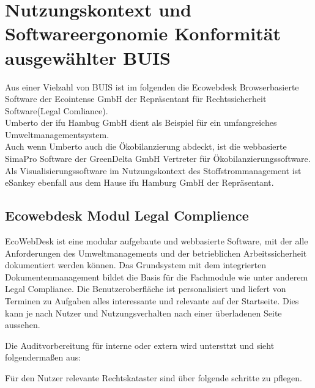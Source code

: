 \documentclass[a4paper, 12pt, twoside, BCOR=20mm, DIV=calc, abstracton, parskip=half*, toc=bibliography, toc=listof, headsepline, footsepline, headings=small, numbers=enddot]{scrreprt}
\begin{document}
\section{Nutzungskontext und Softwareergonomie Konformität ausgewählter BUIS}
Aus einer Vielzahl von \ac{BUIS} ist im folgenden die Ecowebdesk Browserbasierte Software der Ecointense GmbH der Repräsentant für Rechtssicherheit Software(Legal Comliance). \\
Umberto der ifu Hambug GmbH dient als Beispiel für ein umfangreiches Umweltmanagementsystem.\\
Auch wenn Umberto auch die Ökobilanzierung abdeckt, ist die webbasierte SimaPro Software der GreenDelta GmbH Vertreter für Ökobilanzierungssoftware. \\
Als Visualisierungssoftware im Nutzungskontext des Stoffstrommanagement ist eSankey ebenfall aus dem Hause ifu Hamburg GmbH der Repräsentant. 
\subsection{Ecowebdesk Modul Legal Complience}

EcoWebDesk ist eine modular aufgebaute und webbasierte Software, mit der alle Anforderungen des Umweltmanagements und der betrieblichen Arbeitssicherheit dokumentiert werden können.
Das Grundsystem mit dem integrierten Dokumentenmanagement bildet die Basis für die Fachmodule wie unter anderem Legal Compliance. Die Benutzeroberfläche ist personalisiert und liefert von Terminen zu Aufgaben alles interessante und relevante auf der Startseite. Dies kann je nach Nutzer und Nutzungsverhalten nach einer überladenen Seite aussehen. 

Die Auditvorbereitung für interne oder extern wird untersttzt und sieht folgendermaßen aus:

Für den Nutzer relevante Rechtskataster sind über folgende schritte zu pflegen. 

\end{document}
